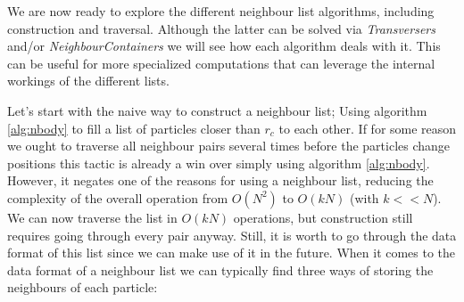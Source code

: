 \documentclass[ twoside,openright,titlepage,numbers=noenddot,%
headinclude,footinclude,cleardoublepage=empty,abstract=on,
BCOR=5mm,paper=b5,fontsize=11pt, dvipsnames
]{scrreprt}
\begin{document}
We are now ready to explore the different neighbour list algorithms, including construction and traversal. Although the latter can be solved via \emph{Transversers} and/or \emph{NeighbourContainers} we will see how each algorithm deals with it. This can be useful for more specialized computations that can leverage the internal workings of the different lists.

Let's start with the naive way to construct a neighbour list; Using algorithm \ref{alg:nbody} to fill a list of particles closer than $r_{c}$ to each other. 
If for some reason we ought to traverse all neighbour pairs several times before the particles change positions this tactic is already a win over simply using algorithm \ref{alg:nbody}. However, it negates one of the reasons for using a neighbour list, reducing the complexity of the overall operation from $O(N^2)$ to $O(kN)$ (with $k<<N$). We can now traverse the list in $O(kN)$ operations, but construction still requires going through every pair anyway.
Still, it is worth to go through the data format of this list since we can make use of it in the future. When it comes to the data format of a neighbour list we can typically find three ways of storing the neighbours of each particle:
\end{document}
